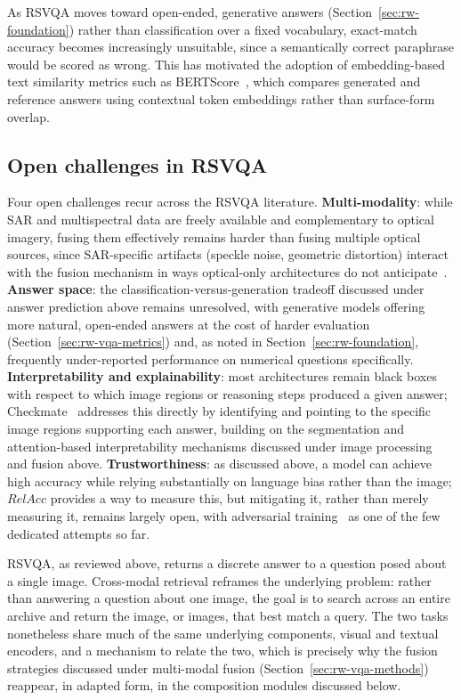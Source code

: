 As RSVQA moves toward open-ended, generative answers (Section~\ref{sec:rw-foundation}) rather than classification over a fixed vocabulary, exact-match accuracy becomes increasingly unsuitable, since a semantically correct paraphrase would be scored as wrong. This has motivated the adoption of embedding-based text similarity metrics such as BERTScore~\cite{zhang2020bertscoreevaluatingtextgeneration}, which compares generated and reference answers using contextual token embeddings rather than surface-form overlap.

\subsection{Open challenges in RSVQA}
\label{sec:rw-vqa-challenges}

Four open challenges recur across the RSVQA literature. \textbf{Multi-modality}: while SAR and multispectral data are freely available and complementary to optical imagery, fusing them effectively remains harder than fusing multiple optical sources, since SAR-specific artifacts (speckle noise, geometric distortion) interact with the fusion mechanism in ways optical-only architectures do not anticipate~\cite{tosato2025b}. \textbf{Answer space}: the classification-versus-generation tradeoff discussed under answer prediction above remains unresolved, with generative models offering more natural, open-ended answers at the cost of harder evaluation (Section~\ref{sec:rw-vqa-metrics}) and, as noted in Section~\ref{sec:rw-foundation}, frequently under-reported performance on numerical questions specifically. \textbf{Interpretability and explainability}: most architectures remain black boxes with respect to which image regions or reasoning steps produced a given answer; Checkmate~\cite{tosato2025checkmate} addresses this directly by identifying and pointing to the specific image regions supporting each answer, building on the segmentation and attention-based interpretability mechanisms discussed under image processing and fusion above. \textbf{Trustworthiness}: as discussed above, a model can achieve high accuracy while relying substantially on language bias rather than the image; $RelAcc$ provides a way to measure this, but mitigating it, rather than merely measuring it, remains largely open, with adversarial training~\cite{yuan2023badversarial} as one of the few dedicated attempts so far.

RSVQA, as reviewed above, returns a discrete answer to a question posed about a single image. Cross-modal retrieval reframes the underlying problem: rather than answering a question about one image, the goal is to search across an entire archive and return the image, or images, that best match a query. The two tasks nonetheless share much of the same underlying components, visual and textual encoders, and a mechanism to relate the two, which is precisely why the fusion strategies discussed under multi-modal fusion (Section~\ref{sec:rw-vqa-methods}) reappear, in adapted form, in the composition modules discussed below.
